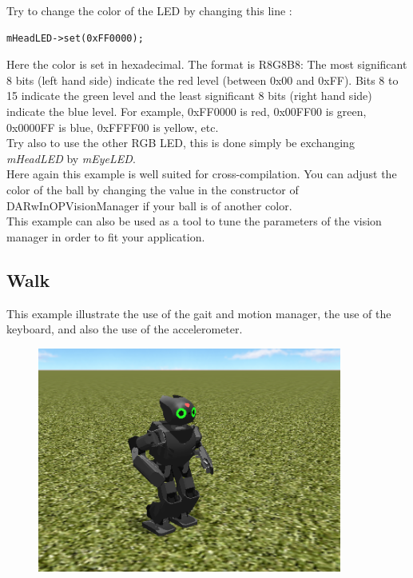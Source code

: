 \documentclass[a4paper, 12pt]{article}  		%
\begin{document}
Try to change the color of the LED by changing this line :
\lstset{language=c++} 
\lstset{commentstyle=\textit} 
\begin{lstlisting} 
mHeadLED->set(0xFF0000);
\end{lstlisting}
Here the color is set in hexadecimal. The format is R8G8B8: The most significant 8 bits (left hand side) indicate the red level (between 0x00 and 0xFF). Bits 8 to 15 indicate the green level and the least significant 8 bits (right hand side) indicate the blue level. For example, 0xFF0000 is red, 0x00FF00 is green, 0x0000FF is blue, 0xFFFF00 is yellow, etc.\\

Try also to use the other RGB LED, this is done simply be exchanging \textit{mHeadLED} by \textit{mEyeLED}.\\

Here again this example is well suited for cross-compilation. You can adjust the color of the ball by changing the value in the constructor of DARwInOPVisionManager if your ball is of another color.\\

This example can also be used as a tool to tune the parameters of the vision manager in order to fit your application.\\


\newpage
\subsection{Walk}

This example illustrate the use of the gait and motion manager, the use of the keyboard, and also the use of the accelerometer.\\

\begin{figure}[H]
\begin{center}
\includegraphics[width=10cm]{example_walk.png}
\label{example_walk.png}
\end{center}
\end{figure}
\end{document}
